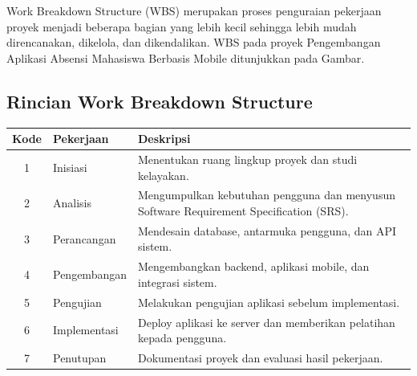 \documentclass[12pt,a4paper]{article}
\begin{document}
Work Breakdown Structure (WBS) merupakan proses penguraian pekerjaan proyek menjadi beberapa bagian yang lebih kecil sehingga lebih mudah direncanakan, dikelola, dan dikendalikan. WBS pada proyek Pengembangan Aplikasi Absensi Mahasiswa Berbasis Mobile ditunjukkan pada Gambar.

\begin{figure}[H]
\centering
{}
\end{figure}

\newpage

\subsection{Rincian Work Breakdown Structure}

\begin{longtable}{cp{5cm}p{7cm}}
    \toprule
    \textbf{Kode} & \textbf{Pekerjaan} & \textbf{Deskripsi} \\
\midrule
1 & Inisiasi & Menentukan ruang lingkup proyek dan studi kelayakan. \\
2 & Analisis & Mengumpulkan kebutuhan pengguna dan menyusun Software Requirement Specification (SRS). \\
3 & Perancangan & Mendesain database, antarmuka pengguna, dan API sistem. \\
4 & Pengembangan & Mengembangkan backend, aplikasi mobile, dan integrasi sistem. \\
5 & Pengujian & Melakukan pengujian aplikasi sebelum implementasi. \\
6 & Implementasi & Deploy aplikasi ke server dan memberikan pelatihan kepada pengguna. \\
7 & Penutupan & Dokumentasi proyek dan evaluasi hasil pekerjaan. \\
\bottomrule
\end{longtable}
\end{document}
